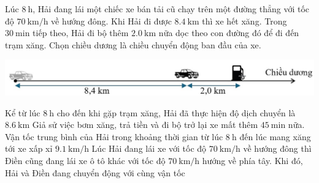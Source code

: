 \begin{ex}
	Lúc $\SI{8}{\hour}$, Hải đang lái một chiếc xe bán tải cũ chạy trên một đường thẳng với tốc độ $\SI{70}{\kilo\meter/\hour}$ về hướng đông. Khi Hải đi được $\SI{8.4}{\kilo\meter}$ thì xe hết xăng. Trong $\SI{30}{\minute}$ tiếp theo, Hải đi bộ thêm $\SI{2.0}{\kilo\meter}$ nữa dọc theo con đường đó để đi đến trạm xăng. Chọn chiều dương là chiều chuyển động ban đầu của xe.
	\begin{center}
		\includegraphics[scale=0.7]{figs/G10Y25B3-39}
	\end{center}
	{Kể từ lúc $\SI{8}{\hour}$ cho đến khi gặp trạm xăng, Hải đã thực hiện độ dịch chuyển là $\SI{8.6}{\kilo\meter}$}
	{Giả sử việc bơm xăng, trả tiền và đi bộ trở lại xe mất thêm $\SI{45}{\minute}$ nữa. Vận tốc trung bình của Hải trong khoảng thời gian từ lúc $\SI{8}{\hour}$ đến lúc mang xăng tới xe xấp xỉ $\SI{9.1}{\kilo\meter/\hour}$}
	{Lúc Hải đang lái xe với tốc độ $\SI{70}{\kilo\meter/\hour}$ về hướng đông thì Điền cũng đang lái xe ô tô khác với tốc độ $\SI{70}{\kilo\meter/\hour}$ hướng về phía tây. Khi đó, Hải và Điền đang chuyển động với cùng vận tốc}
	\loigiai{}
\end{ex}

